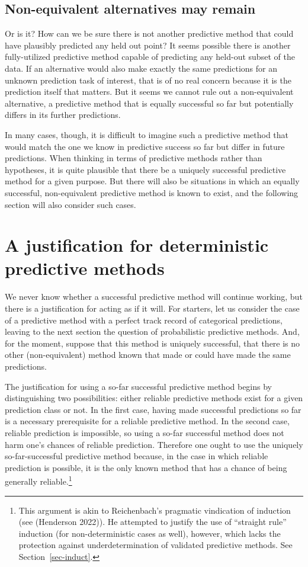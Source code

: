 \documentclass[
  letterpaper,
  DIV=11,
  numbers=noendperiod]{scrartcl}
\theoremstyle{definition}
\theoremstyle{remark}
\begin{document}
\subsection{Non-equivalent alternatives may
remain}\label{non-equivalent-alternatives-may-remain}

Or is it? How can we be sure there is not another predictive method that
could have plausibly predicted any held out point? It seems possible
there is another fully-utilized predictive method capable of predicting
any held-out subset of the data. If an alternative would also make
exactly the same predictions for an unknown prediction task of interest,
that is of no real concern because it is the prediction itself that
matters. But it seems we cannot rule out a non-equivalent alternative, a
predictive method that is equally successful so far but potentially
differs in its further predictions.

In many cases, though, it is difficult to imagine such a predictive
method that would match the one we know in predictive success so far but
differ in future predictions. When thinking in terms of predictive
methods rather than hypotheses, it is quite plausible that there be a
uniquely successful predictive method for a given purpose. But there
will also be situations in which an equally successful, non-equivalent
predictive method is known to exist, and the following section will also
consider such cases.

\section{A justification for deterministic predictive
methods}\label{sec-prag}

We never know whether a successful predictive method will continue
working, but there is a justification for acting as if it will. For
starters, let us consider the case of a predictive method with a perfect
track record of categorical predictions, leaving to the next section the
question of probabilistic predictive methods. And, for the moment,
suppose that this method is uniquely successful, that there is no other
(non-equivalent) method known that made or could have made the same
predictions.

The justification for using a so-far successful predictive method begins
by distinguishing two possibilities: either reliable predictive methods
exist for a given prediction class or not. In the first case, having
made successful predictions so far is a necessary prerequisite for a
reliable predictive method. In the second case, reliable prediction is
impossible, so using a so-far successful method does not harm one's
chances of reliable prediction. Therefore one ought to use the uniquely
so-far-successful predictive method because, in the case in which
reliable prediction is possible, it is the only known method that has a
chance of being generally reliable.\footnote{This argument is akin to
  Reichenbach's pragmatic vindication of induction (see (Henderson
  2022)). He attempted to justify the use of ``straight rule'' induction
  (for non-deterministic cases as well), however, which lacks the
  protection against underdetermination of validated predictive methods.
  See Section~\ref{sec-induct}.}
\end{document}

